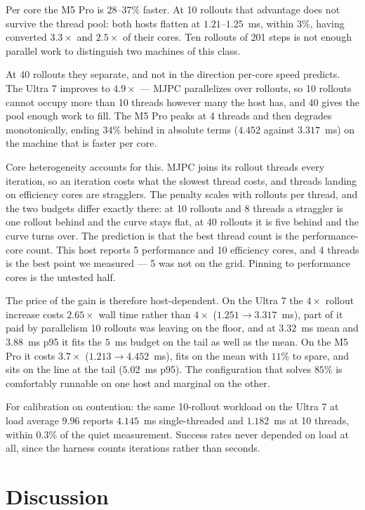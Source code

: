 \documentclass[conference]{IEEEtran}
\begin{document}
Per core the M5 Pro is $28$--$37\%$ faster. At 10 rollouts that advantage does
not survive the thread pool: both hosts flatten at $1.21$--$1.25$~ms, within
$3\%$, having converted $3.3\times$ and $2.5\times$ of their cores. Ten rollouts
of 201 steps is not enough parallel work to distinguish two machines of this
class.

At 40 rollouts they separate, and not in the direction per-core speed predicts.
The Ultra 7 improves to $4.9\times$ --- MJPC parallelizes over rollouts, so 10
rollouts cannot occupy more than 10 threads however many the host has, and 40
gives the pool enough work to fill. The M5 Pro peaks at 4 threads and then
degrades monotonically, ending $34\%$ behind in absolute terms ($4.452$ against
$3.317$~ms) on the machine that is faster per core.

Core heterogeneity accounts for this. MJPC joins its rollout threads every
iteration, so an iteration costs what the slowest thread costs, and threads
landing on efficiency cores are stragglers. The penalty scales with rollouts per
thread, and the two budgets differ exactly there: at 10 rollouts and 8 threads a
straggler is one rollout behind and the curve stays flat, at 40 rollouts it is
five behind and the curve turns over. The prediction is that the best thread
count is the performance-core count. This host reports 5 performance and 10
efficiency cores, and 4 threads is the best point we measured --- 5 was not on
the grid. Pinning to performance cores is the untested half.

The price of the gain is therefore host-dependent. On the Ultra 7 the $4\times$
rollout increase costs $2.65\times$ wall time rather than $4\times$
($1.251 \rightarrow 3.317$~ms), part of it paid by parallelism 10 rollouts was
leaving on the floor, and at $3.32$~ms mean and $3.88$~ms p95 it fits the
$5$~ms budget on the tail as well as the mean. On the M5 Pro it costs
$3.7\times$ ($1.213 \rightarrow 4.452$~ms), fits on the mean with $11\%$ to
spare, and sits on the line at the tail ($5.02$~ms p95). The configuration that
solves $85\%$ is comfortably runnable on one host and marginal on the other.

For calibration on contention: the same 10-rollout workload on the Ultra 7 at
load average $9.96$ reports $4.145$~ms single-threaded and $1.182$~ms at 10
threads, within $0.3\%$ of the quiet measurement. Success rates never depended
on load at all, since the harness counts iterations rather than seconds.

\section{Discussion}
\end{document}
